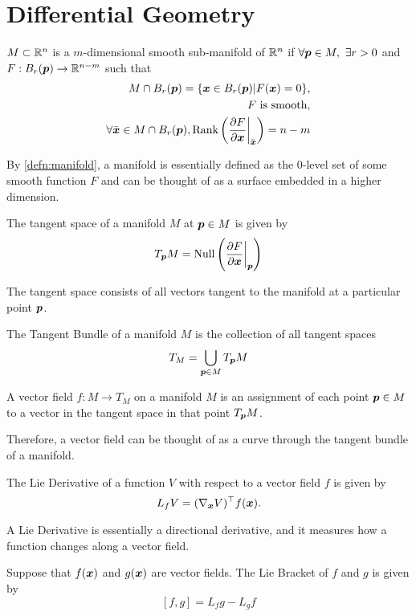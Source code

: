 \section{Differential Geometry}
\begin{definition}
	$M\subset \mathbb{R}^n$ is a $m$-dimensional smooth sub-manifold of $\mathbb{R}^n$ if $\forall
	\boldsymbol{p}\in M,\ \exists r > 0$ and $F: B_r(\boldsymbol{p}) \to \mathbb{R}^{n-m}$ such that \[
		\begin{aligned}
			M \cap B_r(\boldsymbol{p}) = \{\boldsymbol{x}\in B_r(\boldsymbol{p}) | F(\boldsymbol{x}) = 0\},\\
			F\text{ is smooth,}\\
			\forall \bar{\boldsymbol{x}} \in M \cap B_r(\boldsymbol{p}),
			\text{Rank}\left(\frac{\partial F}{\partial \boldsymbol{x}}
			\bigg\rvert_{\bar{\boldsymbol{x}}}\right) = n - m
		\end{aligned}
	\]
	\label{defn:manifold}
\end{definition}
By \cref{defn:manifold}, a manifold is essentially defined as the 0-level set of
some smooth function $F$ and can be thought of as a surface embedded in a higher
dimension.
\begin{definition}
	The tangent space of a manifold $M$ at $\boldsymbol{p}\in M$ is given by \[
		T_{\boldsymbol{p}}M = \text{Null}\left(\frac{\partial F}{\partial
		\boldsymbol{x}}\bigg |_{\boldsymbol{p}}\right)
	\]
	\label{defn:tangent-space}
\end{definition}
The tangent space consists of all vectors tangent to the manifold at a
particular point $\boldsymbol{p}$.
\begin{definition}
	The Tangent Bundle of a manifold $M$ is the collection of all tangent spaces \[
		T_M = \bigcup_{\boldsymbol{p}\in M} T_{\boldsymbol{p}} M
	\]
	\label{defn:tangent-bundle}
\end{definition}
\begin{definition}
	A vector field $f:M\to T_M$ on a manifold $M$ is an assignment of each point $\boldsymbol{p}\in
	M$ to a vector in the tangent space in that point $T_{\boldsymbol{p}}M$.
	\label{defn:vector-field}
\end{definition}
Therefore, a vector field can be thought of as a curve through the tangent
bundle of a manifold.
\begin{definition}
	The Lie Derivative of a function $V$ with respect to a vector field $f$ is
	given by \[
			L_fV = (\nabla_{\boldsymbol{x}}V)^\top f(\boldsymbol{x}).
	\]
	\label{defn:lie-derivative}
\end{definition}
A Lie Derivative is essentially a directional derivative, and it measures how a
function changes along a vector field.
\begin{definition}
	Suppose that $f(\boldsymbol{x})$ and $g(\boldsymbol{x})$ are vector fields. The Lie Bracket of
	$f$ and $g$ is given by \[
		[f, g] = L_fg - L_gf
	\]
	\label{defn:lie-bracket}
\end{definition}
